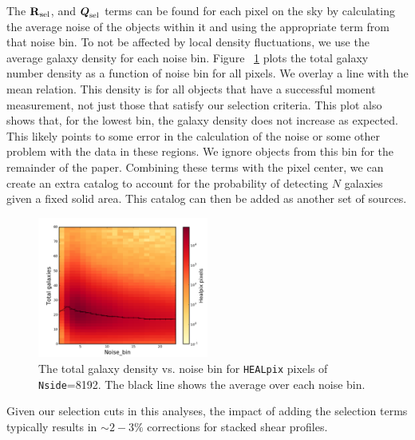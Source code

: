 \documentclass[useAMS,usenatbib]{mnras}
\newcommand{\vecQ}{\mbox{\boldmath $Q$}}
\newcommand{\matR}{\mbox{$\bf R$}}
\begin{document}
The $\matR_{\rm sel}$, and $\vecQ_{\rm sel}$ terms can be found for each pixel on the sky by calculating the average noise of the objects within it and using the appropriate term from that noise bin. To not be affected by local density fluctuations, we use the average galaxy density for each noise bin.  Figure ~\ref{fig:ave_gal_hp} plots the total galaxy number density as a function of noise bin for all pixels.  We overlay a line with the mean relation.  This density is for all objects that have a successful moment measurement, not just those that satisfy our selection criteria.  This plot also shows that, for the lowest bin, the galaxy density does not increase as expected.  This likely points to some error in the calculation of the noise or some other problem with the data in these regions.  We ignore objects from this bin for the remainder of the paper.  Combining these terms with the pixel center, we can create an extra catalog to account for the probability of detecting $N$ galaxies given a fixed solid  area.  This catalog can then be added as another set of sources.


\begin{figure}
    \includegraphics[width=0.5\textwidth]{ave_gal_hp.png}
    \caption{
    The total galaxy density vs. noise bin for \texttt{HEALpix} pixels of \texttt{Nside}=8192.  The black line shows the average over each noise bin.
    }
    \label{fig:ave_gal_hp}
\end{figure}

Given our selection cuts in this analyses, the impact of adding the selection terms typically results in $\sim 2-3\%$ corrections for stacked shear profiles.
\end{document}
